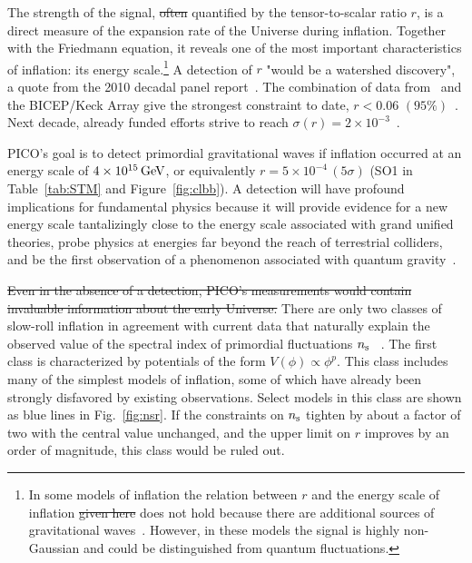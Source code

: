 \documentclass[PICOReport.tex]{subfiles}
\begin{document}
The strength of the signal, \sout{often} quantified by the tensor-to-scalar ratio $r$, is a direct measure of the expansion rate of the Universe during inflation. Together with the Friedmann equation, it reveals one of the most important characteristics of inflation: its energy scale.\footnote{In some models of inflation the relation between $r$ and the energy scale of inflation \sout{given here} does not hold because there are additional sources of gravitational waves~\cite{Namba:2015gja}. However, in these models the signal is highly non-Gaussian and could be distinguished from quantum fluctuations.}  A detection of $r$  "would be a watershed discovery", a quote from the 2010 decadal panel report~\citep{blandford2010}. The combination of data from \planck\ and the BICEP/Keck Array give the strongest constraint to date, $r<0.06\,\, (95\%)$~\citep{2018arXiv181005216A}. Next decade, already funded efforts strive to reach $\sigma(r)=2\times10^{-3}$~\citep{SOscience, BKA}.

PICO's goal is to detect primordial gravitational waves if inflation occurred at an energy scale of  $4\times 10^{15}\,\rm{GeV}$, or equivalently $r= 5\times 10^{-4} \, (5\sigma)$ (SO1 in Table~\ref{tab:STM} and Figure~\ref{fig:clbb}).  
A detection will have profound implications for fundamental physics because it will provide evidence for a new energy scale tantalizingly close to the energy scale associated with grand unified theories, probe physics at energies far beyond the reach of terrestrial colliders, and be the first observation of a phenomenon associated with quantum gravity~\cite{Krauss:2013pha}.

 \sout{Even in the absence of a detection, PICO's measurements would contain invaluable information about the early Universe.} There are only two classes of slow-roll inflation in agreement with current data that naturally explain the observed value of the spectral index of primordial fluctuations $n_{\rm s}$~\cite{??} . The first class is characterized by potentials of the form $V(\phi)\propto\phi^p$. This class includes many of the simplest models of inflation, some of which have already been strongly disfavored by existing observations. Select models in this class are shown as blue lines in Fig.~\ref{fig:nsr}. If the constraints on $n_{\rm s}$ tighten by about a factor of two with the central value unchanged, and the upper limit on $r$ improves by an order of magnitude, this class would be ruled out. 
\end{document}
